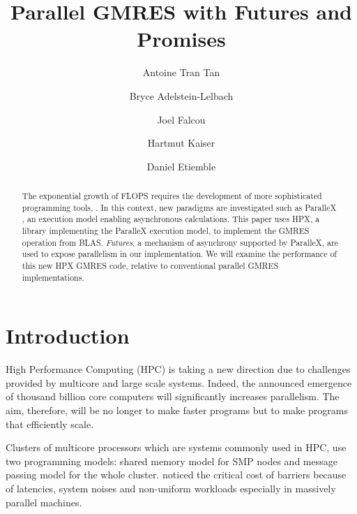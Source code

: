 \documentclass{llncs}
\begin{document}
\title{Parallel GMRES with Futures and Promises}

\author{Antoine Tran Tan \and Bryce Adelstein-Lelbach \and Joel Falcou \and Hartmut Kaiser \and
Daniel Etiemble }

\maketitle

\begin{abstract}
The exponential growth of FLOPS requires the development of more sophisticated
programming tools, . In this context, new paradigms are
investigated such as ParalleX \cite{ParalleX}, an execution model enabling
asynchronous calculations. This paper uses HPX, a library implementing the
ParalleX execution model, to implement the GMRES operation from
BLAS\cite{GMRES}. \emph{Futures}, a mechanism of asynchrony supported by
ParalleX, are used to expose parallelism in our implementation. We will examine
the performance of this new HPX GMRES code, relative to conventional parallel
GMRES implementations. 
\end{abstract}


\section{Introduction}\label{Introduction}
High Performance Computing (HPC) is taking a new direction due to challenges
provided by multicore and large scale systems. Indeed, the announced emergence
of thousand billion core computers will significantly increases parallelism.
The aim, therefore, will be no longer to make faster programs but to make
programs that efficiently scale.\smallskip 

Clusters of multicore processors which are systems commonly used in HPC, use
two programming models: shared memory model for SMP nodes and message passing
model for the whole cluster.  noticed the critical cost of barriers because
of latencies, system noises and non-uniform workloads especially in massively
parallel machines.\smallskip 
\end{document}

